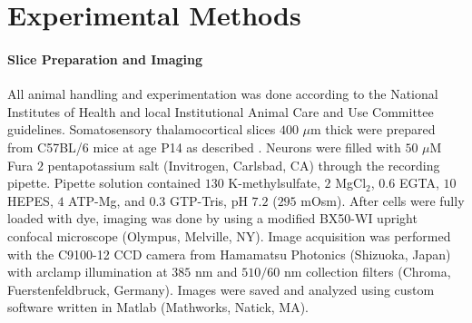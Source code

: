\documentclass[10pt]{article}
\providecommand{\ve}[1]{\boldsymbol{#1}}
\providecommand{\ve}[1]{\boldsymbol{#1}}
\DeclareMathOperator*{\argmax}{argmax}
\newcommand{\thetn}{\ve{\theta}}
\newcommand{\p}{P_{\thetn}}
\newcommand{\Ca}{[\text{Ca}^{2+}]}
\begin{document}
%
%

\section*{Experimental Methods} \label{sec:exp_meth}

\paragraph{Slice Preparation and Imaging}

All animal handling and experimentation was done according to the National Institutes of Health and local Institutional Animal Care and Use Committee guidelines. Somatosensory thalamocortical slices $400$ $\mu$m thick were prepared from C57BL/6 mice at age P14 as described \cite{MacLeanYuste05}. Neurons were filled with $50$ $\mu$M Fura $2$ pentapotassium salt (Invitrogen, Carlsbad, CA) through the recording pipette. Pipette solution contained $130$ K-methylsulfate, $2$ MgCl$_2$, $0.6$ EGTA, $10$ HEPES, $4$ ATP-Mg, and $0.3$ GTP-Tris, pH $7.2$ ($295$ mOsm).  After cells were fully loaded with dye, imaging was done by using a modified BX50-WI upright confocal microscope (Olympus, Melville, NY).  Image acquisition was performed with the C9100-12 CCD camera from Hamamatsu Photonics (Shizuoka, Japan) with arclamp illumination at $385$ nm and $510/60$ nm collection filters (Chroma, Fuerstenfeldbruck, Germany).  Images were saved and analyzed using custom software written in Matlab (Mathworks, Natick, MA).
\end{document}
